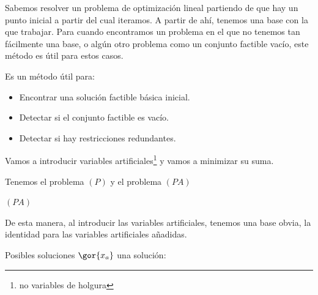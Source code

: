 Sabemos resolver un problema de optimización lineal partiendo de que hay un punto inicial a partir del cual iteramos. 
A partir de ahí, tenemos una base con la que trabajar. 
Para cuando encontramos un problema en el que no tenemos tan fácilmente una base, o algún otro problema como un conjunto factible vacío, este método es útil para estos casos.


Es un método útil para:

\begin{itemize}
\item Encontrar una solución factible básica inicial.

\item Detectar si el conjunto factible es  vacío.

\item Detectar si hay restricciones redundantes.
\end{itemize}


Vamos a introducir variables artificiales\footnote{no variables de holgura} y vamos a minimizar su suma.

Tenemos el problema $(P)$  y el problema $(PA)$

\begin{ioprob}
\textbf{$(PA)$}
\end{ioprob}

De esta manera, al introducir las variables artificiales, tenemos una base obvia, la identidad para las variables artificiales añadidas.

Posibles soluciones $\gor{x_a}$ una solución:

